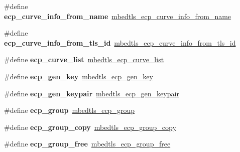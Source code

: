 \begin{DoxyCompactItemize}
\item 
\mbox{\label{compat-1_83_8h_ac84855ce9e0e07dd419110658270ee93}} 
\#define {\bfseries ecp\+\_\+curve\+\_\+info\+\_\+from\+\_\+name}~\mbox{\hyperlink{ecp_8h_a961d3dd5f6c4938054c8f931f2a4ecdc}{mbedtls\+\_\+ecp\+\_\+curve\+\_\+info\+\_\+from\+\_\+name}}
\item 
\mbox{\label{compat-1_83_8h_a2a1bf9e9ee1ee4156ca022a0cfdd6c3a}} 
\#define {\bfseries ecp\+\_\+curve\+\_\+info\+\_\+from\+\_\+tls\+\_\+id}~\mbox{\hyperlink{ecp_8h_aac1e9b4f0112b88fbbc26776c5268c19}{mbedtls\+\_\+ecp\+\_\+curve\+\_\+info\+\_\+from\+\_\+tls\+\_\+id}}
\item 
\mbox{\label{compat-1_83_8h_a1dec2f63d0741df5842df04852867ea2}} 
\#define {\bfseries ecp\+\_\+curve\+\_\+list}~\mbox{\hyperlink{ecp_8h_aee4af7c7ad70564c44ba750cd96ae989}{mbedtls\+\_\+ecp\+\_\+curve\+\_\+list}}
\item 
\mbox{\label{compat-1_83_8h_a40684edbe509bb1423fbacd7e8ecd08e}} 
\#define {\bfseries ecp\+\_\+gen\+\_\+key}~\mbox{\hyperlink{ecp_8h_a0c9a407214f019493ba5d7bc27fa57dc}{mbedtls\+\_\+ecp\+\_\+gen\+\_\+key}}
\item 
\mbox{\label{compat-1_83_8h_ac04799d8b5695cc776d9f38734041114}} 
\#define {\bfseries ecp\+\_\+gen\+\_\+keypair}~\mbox{\hyperlink{ecp_8h_aa7d8987918be4f337102afacf7203d0d}{mbedtls\+\_\+ecp\+\_\+gen\+\_\+keypair}}
\item 
\mbox{\label{compat-1_83_8h_a92d640b179a338d21cd881048928b6ce}} 
\#define {\bfseries ecp\+\_\+group}~\mbox{\hyperlink{structmbedtls__ecp__group}{mbedtls\+\_\+ecp\+\_\+group}}
\item 
\mbox{\label{compat-1_83_8h_a905ddf545ecf244c94a0e466615537fd}} 
\#define {\bfseries ecp\+\_\+group\+\_\+copy}~\mbox{\hyperlink{ecp_8h_a2b6e780826b5d6ba4fd5dd5911e490dc}{mbedtls\+\_\+ecp\+\_\+group\+\_\+copy}}
\item 
\mbox{\label{compat-1_83_8h_a38f54ea99a5c9b90d33387eb82cf697f}} 
\#define {\bfseries ecp\+\_\+group\+\_\+free}~\mbox{\hyperlink{ecp_8h_a97b130596caa2844282181082f66cb90}{mbedtls\+\_\+ecp\+\_\+group\+\_\+free}}

\end{DoxyCompactItemize}
